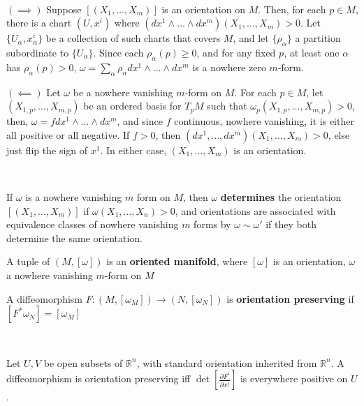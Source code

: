 \documentclass{article}
\begin{document}
\begin{customproof}
  \

  $(\implies)$ Suppose $[(X_1, \dots, X_m)]$ is an orientation on $M$. Then, for each $p \in M$, there is a chart $(U, x^i)$ where $(dx^1 \wedge \dots \wedge dx^m)(X_1, \dots, X_m) > 0$. Let $\{U_\alpha, x^i_\alpha\}$ be a collection of such charts that covers $M$, and let $\{\rho_\alpha\}$ a partition subordinate to $\{U_\alpha\}$. Since each $\rho_\alpha(p) \geq 0$, and for any fixed $p$, at least one $\alpha$ has $\rho_\alpha(p) > 0$, $\omega = \sum_{\alpha} \rho_\alpha dx^1 \wedge \dots \wedge dx^m$ is a nowhere zero $m$-form.

  $(\impliedby)$ Let $\omega$ be a nowhere vanishing $m$-form on $M$. For each $p \in M$, let $(X_{1,p}, \dots, X_{m,p})$ be an ordered basis for $T_pM$ such that $\omega_p(X_{1,p}, \dots, X_{m,p}) >0$, then, $\omega = f dx^1 \wedge \dots \wedge dx^m$, and since $f$ continuous, nowhere vanishing, it is either all positive or all negative. If $f > 0$, then $(dx^1, \dots, dx^m)(X_1, \dots, X_m) > 0$, else just flip the sign of $x^1$. In either case, $(X_1, \dots, X_m)$ is an orientation.
\end{customproof}

\begin{definition}
  \

  If $\omega$ is a nowhere vanishing $m$ form on $M$, then $\omega$ \textbf{determines} the orientation $[(X_1, \dots, X_m)]$ if $\omega(X_1, \dots, X_n) > 0$, and orientations are associated with equivalence classes of nowhere vanishing $m$ forms by $\omega \sim \omega'$ if they both determine the same orientation.

  A tuple of $(M, [\omega])$ is an \textbf{oriented manifold}, where $[\omega]$ is an orientation, $\omega$ a nowhere vanishing $m$-form on $M$

  A diffeomorphism $F: (M, [\omega_M]) \to (N, [\omega_N])$ is \textbf{orientation preserving} if $[F^*\omega_N] = [\omega_M]$
\end{definition}

\begin{proposition}
  \

  Let $U,V$ be open subsets of $\mathbb{R}^n$, with standard orientation inherited from $\mathbb{R}^n$. A diffeomorphism is orientation preserving iff $\det[\frac{\partial F^i}{\partial x^j}]$ is everywhere positive on $U$.
\end{proposition}
\end{document}
